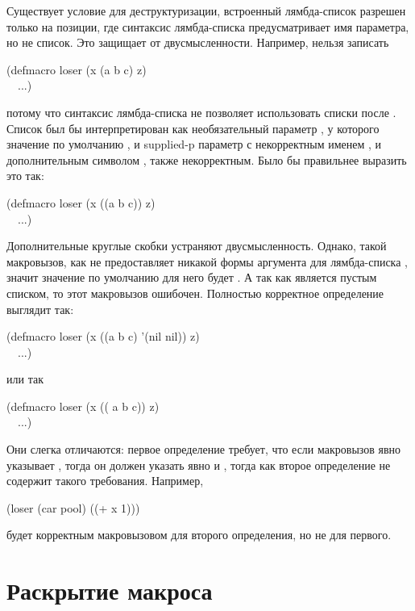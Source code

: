 \begin{defmac}
Существует условие для деструктуризации, встроенный лямбда-список разрешен
только на позиции, где синтаксис лямбда-списка предусматривает имя параметра, но
не список. Это защищает от двусмысленности. Например, нельзя записать
\begin{lisp}
(defmacro loser (x  (a b  c)  z) \\
~~...)
\end{lisp}
потому что синтаксис лямбда-списка не позволяет использовать списки после
. Список  был бы интерпретирован как
необязательный параметр , у которого значение по умолчанию , и
supplied-p параметр с некорректным именем , и дополнительным символом
, также некорректным. Было бы правильнее выразить это так:
\begin{lisp}
(defmacro loser (x  ((a b  c))  z) \\
~~...)
\end{lisp}
Дополнительные круглые скобки устраняют двусмысленность. Однако, такой
макровызов, как  не предоставляет никакой формы аргумента
для лямбда-списка  , значит значение по умолчанию для
него будет {\nil}. А так как {\nil} является пустым списком, то этот макровызов
ошибочен. Полностью корректное определение выглядит так:
\begin{lisp}
(defmacro loser (x  ((a b  c) '(nil nil))  z) \\
~~...)
\end{lisp}
или так
\begin{lisp}
(defmacro loser (x  (( a b  c))  z) \\
~~...)
\end{lisp}
Они слегка отличаются: первое определение требует, что если макровызов явно
указывает , тогда он должен указать явно и , тогда как второе
определение не содержит такого требования. Например,
\begin{lisp}
(loser (car pool) ((+ x 1)))
\end{lisp}
будет корректным макровызовом для второго определения, но не для первого.
\end{defmac}

\section{Раскрытие макроса}

